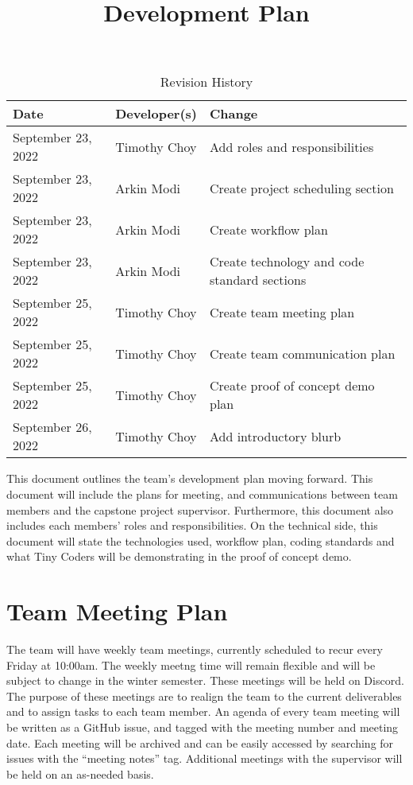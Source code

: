 \documentclass{article}
\title{Development Plan\\\progname}
\author{\authname}
\date{}
\begin{document}
\begin{table}[hp]
\caption{Revision History} \label{TblRevisionHistory}
\begin{tabularx}{\textwidth}{llX}
\toprule
\textbf{Date} & \textbf{Developer(s)} & \textbf{Change}\\
\midrule
September 23, 2022 & Timothy Choy & Add roles and responsibilities\\
September 23, 2022 & Arkin Modi & Create project scheduling section\\
September 23, 2022 & Arkin Modi & Create workflow plan\\
September 23, 2022 & Arkin Modi & Create technology and code standard sections\\
September 25, 2022 & Timothy Choy & Create team meeting plan\\
September 25, 2022 & Timothy Choy & Create team communication plan\\
September 25, 2022 & Timothy Choy & Create proof of concept demo plan\\
September 26, 2022 & Timothy Choy & Add introductory blurb\\
\bottomrule
\end{tabularx}
\end{table}

\newpage

\maketitle

This document outlines the team's development plan moving forward. This document will 
include the plans for meeting, and communications between team members and the capstone project 
supervisor. Furthermore, this document also includes each members' roles and responsibilities. On 
the technical side, this document will state the technologies used, workflow plan, 
coding standards and what Tiny Coders will be demonstrating in the proof of concept demo.

\section{Team Meeting Plan}

The team will have weekly team meetings, currently scheduled to recur every Friday at 10:00am. The 
weekly meetng time will remain flexible and will be subject to change in the winter semester. These 
meetings will be held on Discord. The purpose of these meetings are to realign the team to the current 
deliverables and to assign tasks to each team member. An agenda of every team meeting will be written 
as a GitHub issue, and tagged with the meeting number and meeting date. Each meeting will be archived and 
can be easily accessed by searching for issues with the ``meeting notes'' tag. Additional meetings with 
the supervisor will be held on an as-needed basis.
\end{document}
